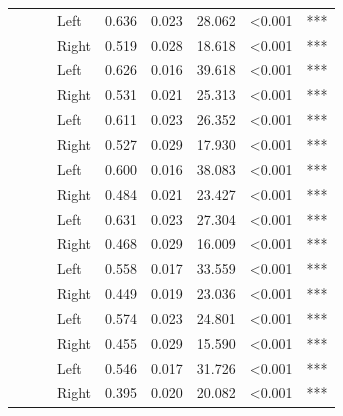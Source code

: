 \begin{longtable}[t]{>{\raggedright\arraybackslash}t{4cm}>{\raggedright\arraybackslash}t{4cm}>{\raggedright\arraybackslash}t{2.5cm}lrrrll}
\pagebreak[0]
 &  &  & Left & 0.636 & 0.023 & 28.062 & <0.001 & ***\\
\nopagebreak
 &  &  & Right & 0.519 & 0.028 & 18.618 & <0.001 & ***\\
\nopagebreak
 &  &  & Left & 0.626 & 0.016 & 39.618 & <0.001 & ***\\
\nopagebreak
 &  &  & Right & 0.531 & 0.021 & 25.313 & <0.001 & ***\\
\nopagebreak
 &  &  & Left & 0.611 & 0.023 & 26.352 & <0.001 & ***\\
\nopagebreak
 &  &  & Right & 0.527 & 0.029 & 17.930 & <0.001 & ***\\
\nopagebreak
 &  &  & Left & 0.600 & 0.016 & 38.083 & <0.001 & ***\\
\nopagebreak
 &  &  & Right & 0.484 & 0.021 & 23.427 & <0.001 & ***\\
\nopagebreak
 &  &  & Left & 0.631 & 0.023 & 27.304 & <0.001 & ***\\
\nopagebreak
 &  &  & Right & 0.468 & 0.029 & 16.009 & <0.001 & ***\\
\nopagebreak
 &  &  & Left & 0.558 & 0.017 & 33.559 & <0.001 & ***\\
\nopagebreak
 &  &  & Right & 0.449 & 0.019 & 23.036 & <0.001 & ***\\
\nopagebreak
 &  &  & Left & 0.574 & 0.023 & 24.801 & <0.001 & ***\\
\nopagebreak
 &  &  & Right & 0.455 & 0.029 & 15.590 & <0.001 & ***\\
\nopagebreak
 &  &  & Left & 0.546 & 0.017 & 31.726 & <0.001 & ***\\
\nopagebreak
 &  &  & Right & 0.395 & 0.020 & 20.082 & <0.001 & ***\\

\end{longtable}
